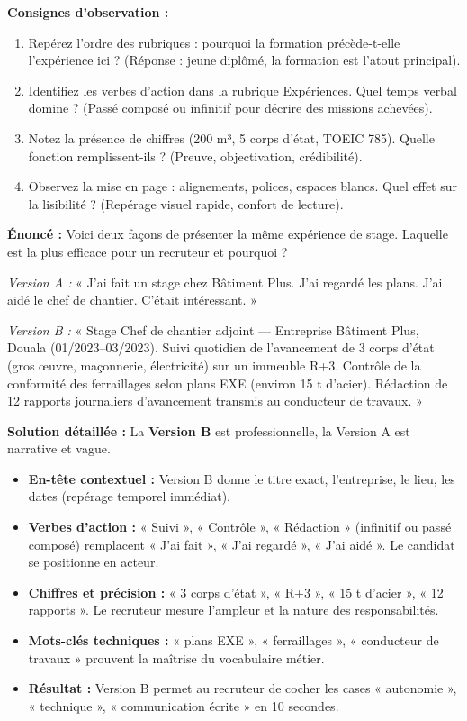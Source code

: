 \documentclass[11pt]{article}
\newcommand{\cle}[1]{{\popxbold\color{popdark}#1}}
\begin{document}
\noindent
\textbf{Consignes d'observation :}
\begin{enumerate}
    \item Repérez l'ordre des rubriques : pourquoi la formation précède-t-elle l'expérience ici ? (Réponse : jeune diplômé, la formation est l'atout principal).
    \item Identifiez les verbes d'action dans la rubrique Expériences. Quel temps verbal domine ? (Passé composé ou infinitif pour décrire des missions achevées).
    \item Notez la présence de chiffres (200 m³, 5 corps d'état, TOEIC 785). Quelle fonction remplissent-ils ? (Preuve, objectivation, crédibilité).
    \item Observez la mise en page : alignements, polices, espaces blancs. Quel effet sur la lisibilité ? (Repérage visuel rapide, confort de lecture).
\end{enumerate}

\begin{exoresolu}
\textbf{Énoncé :} Voici deux façons de présenter la même expérience de stage. Laquelle est la plus efficace pour un recruteur et pourquoi ?

\textit{Version A :} « J'ai fait un stage chez Bâtiment Plus. J'ai regardé les plans. J'ai aidé le chef de chantier. C'était intéressant. »

\textit{Version B :} « Stage Chef de chantier adjoint — Entreprise Bâtiment Plus, Douala (01/2023–03/2023). Suivi quotidien de l'avancement de 3 corps d'état (gros œuvre, maçonnerie, électricité) sur un immeuble R+3. Contrôle de la conformité des ferraillages selon plans EXE (environ 15 t d'acier). Rédaction de 12 rapports journaliers d'avancement transmis au conducteur de travaux. »

\tcblower
\textbf{Solution détaillée :}
La \textbf{Version B} est professionnelle, la Version A est narrative et vague.
\begin{itemize}
    \item \textbf{En-tête contextuel :} Version B donne le titre exact, l'entreprise, le lieu, les dates (repérage temporel immédiat).
    \item \textbf{Verbes d'action :} « Suivi », « Contrôle », « Rédaction » (infinitif ou passé composé) remplacent « J'ai fait », « J'ai regardé », « J'ai aidé ». Le candidat se positionne en \cle{acteur}.
    \item \textbf{Chiffres et précision :} « 3 corps d'état », « R+3 », « 15 t d'acier », « 12 rapports ». Le recruteur mesure l'\cle{ampleur} et la \cle{nature} des responsabilités.
    \item \textbf{Mots-clés techniques :} « plans EXE », « ferraillages », « conducteur de travaux » prouvent la maîtrise du vocabulaire métier.
    \item \textbf{Résultat :} Version B permet au recruteur de cocher les cases « autonomie », « technique », « communication écrite » en 10 secondes.
\end{itemize}
\end{exoresolu}
\end{document}
